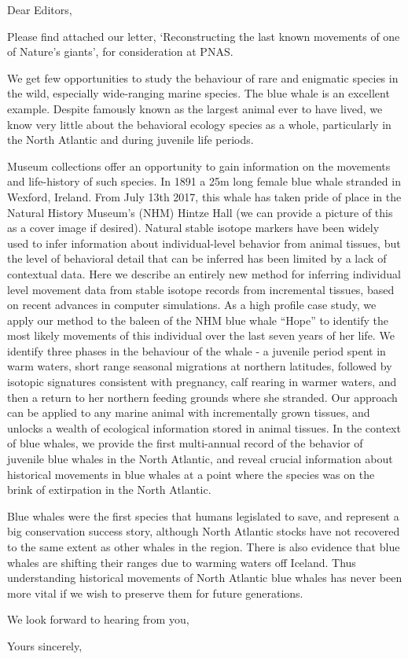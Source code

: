 \documentclass[11pt]{letter}
\begin{document}
\begin{letter}{}
\opening{Dear Editors,}

Please find attached our letter, `Reconstructing the last known movements of one of Nature's giants', for consideration at PNAS.

We get few opportunities to study the behaviour of rare and enigmatic species in the wild, especially wide-ranging marine species. 
The blue whale is an excellent example. 
Despite famously known as the largest animal ever to have lived, we know very little about the behavioral ecology species as a whole, particularly in the North Atlantic and during juvenile life periods.

Museum collections offer an opportunity to gain information on the movements and life-history of such species. 
In 1891 a 25m long female blue whale stranded in Wexford, Ireland. 
From July 13th 2017, this whale has taken pride of place in the Natural History Museum's (NHM) Hintze Hall (we can provide a picture of this as a cover image if desired).
Natural stable isotope markers have been widely used to infer information about individual-level behavior from animal tissues, but the level of behavioral detail that can be inferred has been limited by a lack of contextual data. 
Here we describe an entirely new method for inferring individual level movement data from stable isotope records from incremental tissues, based on recent advances in computer simulations. 
As a high profile case study, we apply our method to the baleen of the NHM blue whale ``Hope'' to identify the most likely movements of this individual over the last seven years of her life. We identify three phases in the behaviour of the whale - a juvenile period spent in warm waters, short range seasonal migrations at northern latitudes, followed by isotopic signatures consistent with pregnancy, calf rearing in warmer waters, and then a return to her northern feeding grounds where she stranded. Our approach can be applied to any marine animal with incrementally grown tissues, and unlocks a wealth of ecological information stored in animal tissues. In the context of blue whales, we provide the first multi-annual record of the behavior of juvenile blue whales in the North Atlantic, and reveal crucial information about historical movements in blue whales at a point where the species was on the brink of extirpation in the North Atlantic.

Blue whales were the first species that humans legislated to save, and represent a big conservation success story, although North Atlantic stocks have not recovered to the same extent as other whales in the region. There is also evidence that blue whales are shifting their ranges due to warming waters off Iceland. Thus understanding historical movements of North Atlantic blue whales has never been more vital if we wish to preserve them for future generations.
 
We look forward to hearing from you,


\closing{Yours sincerely,}


\end{letter}
\end{document}
